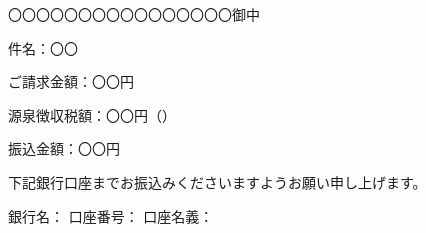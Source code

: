 \documentclass{jlreq}
\begin{document}



〇〇〇〇〇〇〇〇〇〇〇〇〇〇〇〇御中




件名：〇〇

ご請求金額：〇〇円

源泉徴収税額：〇〇円（）

振込金額：〇〇円

下記銀行口座までお振込みくださいますようお願い申し上げます。

銀行名：
口座番号：
口座名義：
\end{document}
